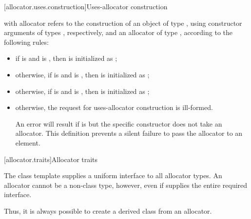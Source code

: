 [allocator.uses.construction]{Uses-allocator construction}

\pnum
{} with allocator  refers to the
construction of an object  of type , using constructor arguments
 of types , respectively, and an allocator
 of type , according to the following rules:

\begin{itemize}
\item if  is  and
 is , then  is
initialized as ;

\item otherwise, if  is  and
  is
, then  is initialized as ;

\item otherwise, if  is  and
 is , then
 is initialized as ;

\item otherwise, the request for uses-allocator construction is ill-formed. \begin{note}
An error will result if  is  but the
specific constructor does not take an allocator. This definition prevents a silent
failure to pass the allocator to an element. \end{note}
\end{itemize}

[allocator.traits]{Allocator traits}

\pnum
The class template  supplies a uniform interface to all
allocator types.
An allocator cannot be a non-class type, however, even if 
supplies the entire required interface. \begin{note} Thus, it is always possible to create
a derived class from an allocator. \end{note}

